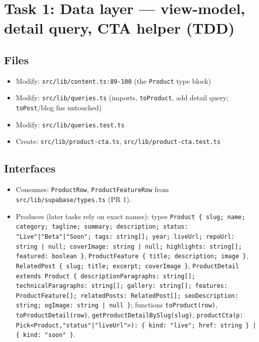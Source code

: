 \documentclass[11pt,a4paper]{article}
\begin{document}
\section{Task 1: Data layer --- view-model, detail query, CTA helper (TDD)}

\subsection*{Files}
\begin{itemize}
  \item Modify: \texttt{src/lib/content.ts:89-100} (the \texttt{Product} type block)
  \item Modify: \texttt{src/lib/queries.ts} (imports, \texttt{toProduct}, add detail query;
        \texttt{toPost}/blog fns untouched)
  \item Modify: \texttt{src/lib/queries.test.ts}
  \item Create: \texttt{src/lib/product-cta.ts}, \texttt{src/lib/product-cta.test.ts}
\end{itemize}

\subsection*{Interfaces}
\begin{itemize}
  \item Consumes: \texttt{ProductRow}, \texttt{ProductFeatureRow} from
        \texttt{src/lib/supabase/types.ts} (PR 1).
  \item Produces (later tasks rely on exact names): types
        \lstinline!Product { slug; name; category; tagline; summary; description; status: "Live"|"Beta"|"Soon"; tags: string[]; year; liveUrl; repoUrl: string | null; coverImage: string | null; highlights: string[]; featured: boolean }!,
        \lstinline!ProductFeature { title; description; image }!,
        \lstinline!RelatedPost { slug; title; excerpt; coverImage }!,
        \lstinline!ProductDetail extends Product { descriptionParagraphs: string[]; technicalParagraphs: string[]; gallery: string[]; features: ProductFeature[]; relatedPosts: RelatedPost[]; seoDescription: string; ogImage: string | null }!;
        functions \lstinline!toProduct(row)!, \lstinline!toProductDetail(row)!,
        \lstinline!getProductDetailBySlug(slug)!,
        \lstinline!productCta(p: Pick<Product,"status"|"liveUrl">): { kind: "live"; href: string } | { kind: "soon" }!.
\end{itemize}
\end{document}
